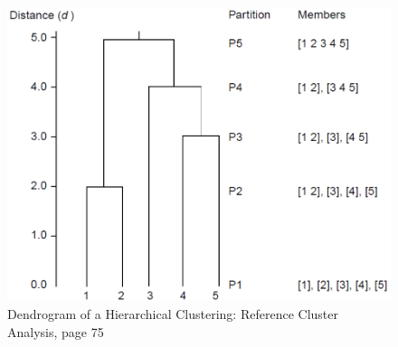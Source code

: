 \documentclass[a4paper,10pt]{article}
\theoremstyle{plain}
\theoremstyle{definition}
\begin{document}
\begin{figure}[H]
	\centering
	\includegraphics*[scale=0.3]{./pictures/hc/hc_example.png}
	\caption{Dendrogram of a Hierarchical Clustering: Reference Cluster Analysis, page 75}
	\label{fig:hc example}
\end{figure}
\end{document}
